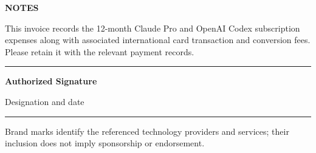 \documentclass[10pt,a4paper]{article}
\newcommand{\fieldlabel}[1]{{\fontsize{7.5}{9}\selectfont\bfseries\color{TextGray}\MakeUppercase{#1}}}
\begin{document}
\vspace{5mm}

\vfill
\begin{minipage}[b]{0.48\textwidth}
  \fieldlabel{Notes}\par
  \vspace{1.5mm}
  {\footnotesize\color{TextGray}
  This invoice records the 12-month Claude Pro and OpenAI Codex subscription expenses along with associated international card transaction and conversion fees. Please retain it with the relevant payment records.}
\end{minipage}%
\hfill
\begin{minipage}[b]{0.38\textwidth}
  \centering
  \vspace{10mm}
  {\color{RuleGray}\rule{0.88\textwidth}{0.6pt}}\par
  \vspace{1.5mm}
  {\small\bfseries\color{Navy}Authorized Signature}\par
  {\footnotesize\color{TextGray}Designation and date}
\end{minipage}

\vspace{5mm}
{\color{RuleGray}\rule{\textwidth}{0.5pt}}\par
\vspace{1.5mm}
{\centering\fontsize{6.8}{8}\selectfont\color{TextGray}
Brand marks identify the referenced technology providers and services; their inclusion does not imply sponsorship or endorsement.\par}
\end{document}

